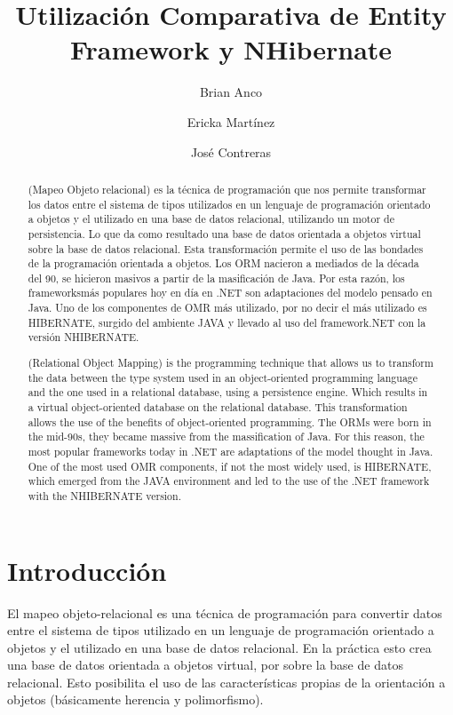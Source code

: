 \documentclass{article}
\title{\textbf{Utilización Comparativa de Entity Framework y NHibernate}}
\author[1]{Brian Anco}
\author[2]{Ericka Martínez}
\author[3]{José Contreras}
\affil[1]{Universidad Privada de Tacna, Perú. Email: briancoc@upt.pe}
\affil[2]{Universidad Privada de Tacna, Perú. Email: erimartinezy@upt.pe}
\affil[3]{Universidad Privada de Tacna, Perú. Email: joscontrerasm@upt.pe}
\date{}
\begin{document}
\maketitle

\begin{abstract}
     (Mapeo Objeto relacional) es la técnica de programación que nos permite transformar los datos entre el sistema de tipos utilizados en un lenguaje de programación orientado a objetos y el utilizado en una base de datos relacional, utilizando un motor de persistencia. Lo que da como resultado una base de datos orientada a objetos virtual sobre la base de datos relacional. Esta transformación permite el uso de las bondades de la programación orientada a objetos. Los ORM nacieron a mediados de la década del 90, se hicieron masivos a partir de la masificación de Java. Por esta razón, los frameworksmás populares hoy en día en .NET son adaptaciones del modelo pensado en Java. Uno de los componentes de OMR más utilizado, por no decir el más utilizado es HIBERNATE, surgido del ambiente JAVA y llevado al uso del framework.NET con la versión NHIBERNATE.
\end{abstract}

\begin{abstract}
(Relational Object Mapping) is the programming technique that allows us to transform the data between the type system used in an object-oriented programming language and the one used in a relational database, using a persistence engine. Which results in a virtual object-oriented database on the relational database. This transformation allows the use of the benefits of object-oriented programming. The ORMs were born in the mid-90s, they became massive from the massification of Java. For this reason, the most popular frameworks today in .NET are adaptations of the model thought in Java. One of the most used OMR components, if not the most widely used, is HIBERNATE, which emerged from the JAVA environment and led to the use of the .NET framework with the NHIBERNATE version.  
\end{abstract}


\section{Introducción}
 El mapeo objeto-relacional es una técnica de programación para convertir datos entre el sistema de tipos utilizado en un lenguaje de programación orientado a objetos y el utilizado en una base de datos relacional. En la práctica esto crea una base de datos orientada a objetos virtual, por sobre la base de datos relacional. Esto posibilita el uso de las características propias de la orientación a objetos (básicamente herencia y polimorfismo).
\newpage
\end{document}
